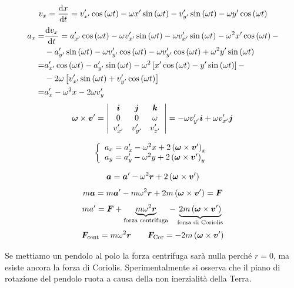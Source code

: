 \[v_x=\frac{\mathrm{d} x}{\mathrm{d} t}=v'_{x'}\cos\left(\omega t\right)-\omega x'\sin\left(\omega t\right)-v'_{y'}\sin\left(\omega t\right)-\omega y'\cos\left(\omega t\right)\]
\begin{align*}
  a_x= & \frac{\mathrm{d} v_x}{\mathrm{d} t}=a'_{x'}\cos\left(\omega t\right)-\omega v'_{x'}\sin\left(\omega t\right)-\omega v'_{x'}\sin\left(\omega t\right)-\omega^2 x'\cos\left(\omega t\right)- \\
       & -a'_{y'}\sin\left(\omega t\right)-\omega v'_{y'}\cos\left(\omega t\right)-\omega v'_{y'}\cos\left(\omega t\right)+\omega^2 y'\sin\left(\omega t\right)                       \\
  =    & a'_{x'}\cos\left(\omega t\right)-a'_{y'}\sin\left(\omega t\right)-\omega^2\left[x'\cos\left(\omega t\right)-y'\sin\left(\omega t\right)\right]-                              \\
       & -2\omega\left[v'_{x'}\sin\left(\omega t\right)+v'_{y'}\cos\left(\omega t\right)\right]                                                                                       \\
  =    & a'_{x}-\omega^2 x-2\omega v'_{y}
\end{align*}
\[\boldsymbol{\omega}\times\boldsymbol{v}'=\left|\begin{array}{ccc}
    \boldsymbol{i}   & \boldsymbol{j}   & \boldsymbol{k}   \\
    0       & 0       & \omega  \\
    v'_{x'} & v'_{y'} & v'_{z'} \\
  \end{array}
  \right|
  =-\omega v'_{y'}\boldsymbol{i}+\omega v'_{x'}\boldsymbol{j}\]

\[\left\{\begin{array}{l}
    a_x=a'_x-\omega^2 x+2\left(\boldsymbol{\omega}\times\boldsymbol{v}'\right)_x \\
    a_y=a'_y-\omega^2 y+2\left(\boldsymbol{\omega}\times\boldsymbol{v}'\right)_y \\
  \end{array}\right.\]

\[\boldsymbol{a}=\boldsymbol{a}'-\omega^2 \boldsymbol{r}+2\left(\boldsymbol{\omega}\times\boldsymbol{v}'\right)\]
\[m\boldsymbol{a}=m\boldsymbol{a}'-m\omega^2\boldsymbol{r}+2m\left(\boldsymbol{\omega}\times\boldsymbol{v}'\right)=\boldsymbol{F}\]
\[ma'=\boldsymbol{F}+\underbrace{m\omega^2\boldsymbol{r}}_\text{forza centrifuga}-\underbrace{2m\left(\boldsymbol{\omega}\times\boldsymbol{v}'\right)}_\text{forza di Coriolis}\]
\[\boldsymbol{F}_\text{cent}=m\omega^2 \boldsymbol{r}\qquad \boldsymbol{F}_\text{Cor}=-2m\left(\boldsymbol{\omega}\times\boldsymbol{v}'\right)\]

\begin{Es}
  Se mettiamo un pendolo al polo la forza centrifuga sarà nulla perché $r=0$, ma esiste ancora la forza di Coriolis. Sperimentalmente si osserva che il piano di rotazione del pendolo ruota a causa della non inerzialità della Terra.
\end{Es}
